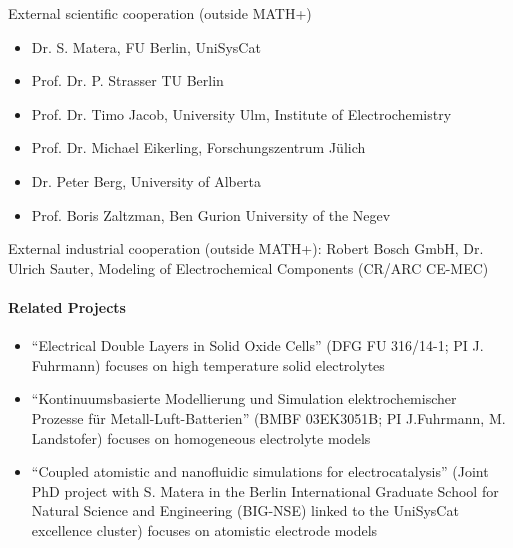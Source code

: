 \documentclass[a4paper,10pt]{article}
\begin{document}
External scientific cooperation (outside MATH+)
\begin{itemize}
\item Dr. S. Matera, FU Berlin, UniSysCat
\item Prof. Dr. P. Strasser TU Berlin
\item Prof. Dr. Timo Jacob, University Ulm, Institute of Electrochemistry     
\item Prof. Dr. Michael Eikerling, Forschungszentrum Jülich
\item Dr. Peter Berg, University of Alberta
\item Prof. Boris Zaltzman, Ben Gurion University of the Negev
\end{itemize}

External industrial cooperation (outside MATH+): Robert Bosch GmbH, Dr. Ulrich Sauter, Modeling of Electrochemical Components (CR/ARC CE-MEC) 

\paragraph{Related Projects}
\begin{itemize}
\item ``Electrical Double Layers in Solid Oxide Cells'' (DFG FU 316/14-1; PI J. Fuhrmann) focuses
  on high temperature solid electrolytes
\item ``Kontinuumsbasierte Modellierung und Simulation elektrochemischer Prozesse für Metall-Luft-Batterien''
  (BMBF  03EK3051B; PI J.Fuhrmann, M. Landstofer) focuses on homogeneous electrolyte models
\item ``Coupled atomistic and nanofluidic simulations for electrocatalysis'' (Joint PhD project with S. Matera
  in the  Berlin International Graduate School for Natural Science and Engineering (BIG-NSE) linked
  to the UniSysCat excellence cluster) focuses on atomistic electrode models
\end{itemize}
\end{document}
